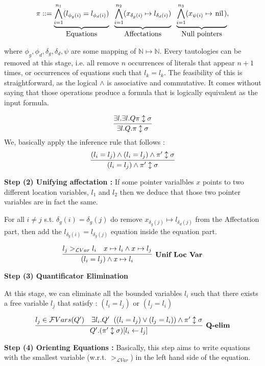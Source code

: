 \documentclass[a4paper,twoside,12pt]{report}
\newcommand\LVar{\mathcal{L}Var} %
\newcommand{\gton}[1]{>_{#1}}
\newcommand{\gtlvar}[0]{\gton{\LVar}}
\newcommand{\EqLoc}[2]{ (#1 = #2) }
\newcommand{\Andpure}[2]{ #1 \wedge #2}
\newcommand{\Pointsto}[2]{ #1 \mapsto #2}
\newcommand{\nil}[0]{\lstinline!nil!}
\newcommand{\Pointstonil}[1]{ #1 \mapsto \mbox{\nil}}
\newcommand{\Formula}[2]{ #1  \updownarrow #2}
\newcommand{\FVars}[1]{\mathcal{F}Vars(#1)}
\newcommand{\Subst}[3]{#3\lbrack #1\leftarrow #2 \rbrack}
\begin{document}
$$ \pi ::= \underbrace{\bigwedge_{i=1}^{n_1}(l_{{\phi}_g(i)}=l_{{\phi}_d(i)})}_{\mbox{Equations}} \gspace \underbrace{\bigwedge_{i=1}^{n_2}(\Pointsto{x_{\delta_g(i)}}{l_{\delta_d(i)}})}_{\mbox{Affectations}} \gspace \underbrace{\bigwedge_{i=1}^{n_3}(\Pointstonil{x_{\psi(i)}})}_{\mbox{Null pointers}}, $$

where $\phi_g,\phi_d,\delta_g,\delta_d,\psi$ are some mapping of $\mathbb{N}\mapsto \mathbb{N}$.
Every tautologies can be removed at this stage, i.e. all remove $n$ occurrences
of literals that appear $n+1$ times, or occurrences of equations such that $l_k=l_k$.
The feasibility of this is straightforward, as the logical $\wedge$ is associative and commutative. It comes without saying that those operations produce a formula that is logically equivalent as the input formula.

$$
\infer{\exists l.Q. \Formula{\pi}{\sigma}}{\exists l.\exists l. Q \Formula{\pi}{\sigma}}$$ 
We, basically apply the inference rule that follows :
$$\infer{\Formula{\Andpure{\EqLoc{l_i}{l_j}}{\pi^{\prime}}}{\sigma}}{\Formula{\Andpure{\EqLoc{l_i}{l_j}}{\Andpure{\EqLoc{l_i}{l_j}}{\pi^{\prime}}}}{\sigma}}
$$


{\bf Step (2) Unifying affectation :}
If some pointer varialbles $x$ points to two different location variables, $l_1$ and $l_2$ then we deduce that those two pointer variables are in fact the same.


For all $i\neq j$ s.t. $\delta_{g}(i)=\delta_{g}(j)$ do 
	remove  $\Pointsto{x_{\delta_g(j)}}{l_{\delta_d(j)}}$ from
	the Affectation part, then add the $l_{\delta_g(i)}=l_{\delta_g(j)}$
	equation inside the equation part.

$$ \infer[\mbox{\textbf{Unif Loc Var}}]{ \EqLoc{l_i}{l_j} \wedge \Pointsto{x}{l_i}}{ l_j \gtlvar l_i & \Pointsto{x}{l_i}\wedge \Pointsto{x}{l_j}}$$

{\bf Step (3) Quantificator Elimination}

At this stage, we can eliminate all the bounded variables $l_i$ such that there
exists a free variable $l_j$ that satisfy : $(l_i=l_j)$ or $(l_j=l_i)$

$$
\infer[\mbox{\textbf{Q-elim}}]{Q^{\prime} .\Subst{l_i}{l_j}{(\Formula{\pi^{\prime}}{\sigma})}}{l_j \in \FVars{Q^{\prime} } & \exists l_i.Q^{\prime} \gspace (\EqLoc{l_i}{l_j} \vee \EqLoc{l_j}{l_i})\wedge \Formula{\pi^{\prime}}{\sigma}}
$$

{\bf Step (4) Orienting Equations :}
Basically, this step aims to write equations with the smallest variable (w.r.t. 
$\gtlvar$) in the left hand side of the equation.
\end{document}
